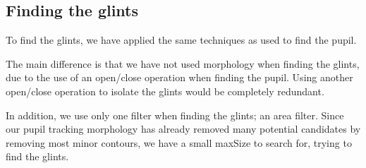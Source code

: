 \subsection{Finding the glints}
To find the glints, we have applied the same techniques as used to find the pupil.\newline

The main difference is that we have not used morphology when finding the glints, due to the use of an open/close operation when finding the pupil. Using another open/close operation to isolate the glints would be completely redundant.\newline

In addition, we use only one filter when finding the glints; an area filter. Since our pupil tracking morphology has already removed many potential candidates by removing most minor contours, we have a small maxSize to search for, trying to find the glints.